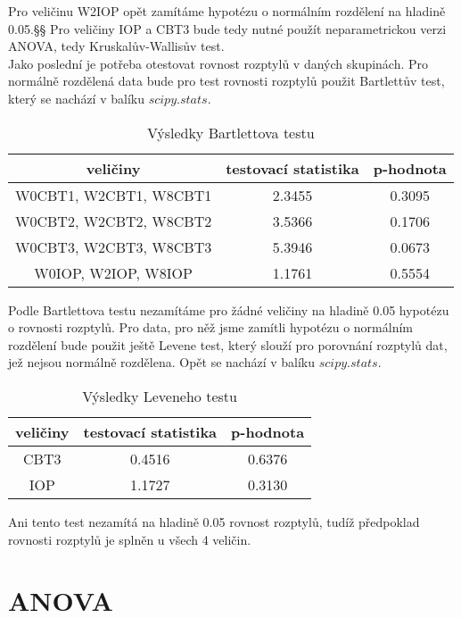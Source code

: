\documentclass{article}
\begin{document}
Pro veličinu W2IOP opět zamítáme hypotézu o normálním rozdělení na hladině 0.05.§§
Pro veličiny IOP a CBT3 bude tedy nutné použít neparametrickou verzi ANOVA, tedy Kruskalův-Wallisův test.\\


Jako poslední je potřeba otestovat rovnost rozptylů v daných skupinách.
Pro normálně rozdělená data bude pro test rovnosti rozptylů použit Bartlettův test, který se nachází v balíku $scipy.stats$.

\begin{table}[H]
  \small
  \centering
  \caption{Výsledky Bartlettova testu}
  \begin{tabular}{|ccc|}
    \hline
    veličiny & testovací statistika & p-hodnota\\
    \hline
    W0CBT1, W2CBT1, W8CBT1 & 2.3455 & 0.3095\\
    W0CBT2, W2CBT2, W8CBT2 & 3.5366 & 0.1706\\
    W0CBT3, W2CBT3, W8CBT3 & 5.3946 & 0.0673\\
    W0IOP, W2IOP, W8IOP & 1.1761 & 0.5554\\
    \hline
  \end{tabular}
\end{table}

Podle Bartlettova testu nezamítáme pro žádné veličiny na hladině 0.05 hypotézu o rovnosti rozptylů.
Pro data, pro něž jsme zamítli hypotézu o normálním rozdělení bude použit ještě Levene test, který slouží pro porovnání
rozptylů dat, jež nejsou normálně rozdělena. Opět se nachází v balíku $scipy.stats$.

\begin{table}[H]
  \small
  \centering
  \caption{Výsledky Leveneho testu}
  \begin{tabular}{|ccc|}
    \hline
    veličiny & testovací statistika & p-hodnota\\
    \hline
    CBT3 & 0.4516 & 0.6376\\
    IOP & 1.1727 & 0.3130\\
    \hline
  \end{tabular}
\end{table}

Ani tento test nezamítá na hladině 0.05 rovnost rozptylů, tudíž předpoklad rovnosti rozptylů je splněn u všech 4 veličin.

\newpage

\section{ANOVA}
\end{document}
